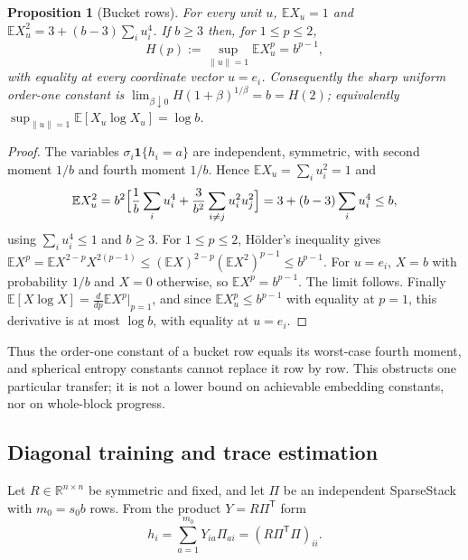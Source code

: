 \documentclass[11pt,a4paper]{article}
\newtheorem{proposition}[theorem]{Proposition}
\theoremstyle{definition}
\theoremstyle{remark}
\newcommand{\E}{\mathbb E}
\newcommand{\R}{\mathbb R}
\newcommand{\norm}[1]{\lVert#1\rVert}
\newcommand{\1}{\mathbf 1}
\newcommand{\T}{\mathsf T}
\begin{document}
\begin{proposition}[Bucket rows]\label{prop:bucketrow}
For every unit $u$, $\E X_u=1$ and $\E X_u^2=3+(b-3)\sum_iu_i^4$. If
$b\ge3$ then, for $1\le p\le2$,
\[
 H(p):=\sup_{\norm u=1}\E X_u^p=b^{p-1},
\]
with equality at every coordinate vector $u=e_i$. Consequently the sharp
uniform order-one constant is
$\lim_{\beta\downarrow0}H(1+\beta)^{1/\beta}=b=H(2)$; equivalently
$\sup_{\norm u=1}\E[X_u\log X_u]=\log b$.
\end{proposition}
\begin{proof}
The variables $\sigma_i\1\{h_i=a\}$ are independent, symmetric, with
second moment $1/b$ and fourth moment $1/b$. Hence $\E X_u=\sum_iu_i^2=1$
and
\[
 \E X_u^2=b^2\Bigl[\frac1b\sum_iu_i^4+\frac3{b^2}\sum_{i\ne j}u_i^2u_j^2\Bigr]
 =3+(b-3)\sum_iu_i^4\le b,
\]
using $\sum_iu_i^4\le1$ and $b\ge3$. For $1\le p\le2$, H\"older's
inequality gives
$\E X^p=\E X^{2-p}X^{2(p-1)}\le(\E X)^{2-p}(\E X^2)^{p-1}\le b^{p-1}$.
For $u=e_i$, $X=b$ with probability $1/b$ and $X=0$ otherwise, so
$\E X^p=b^{p-1}$. The limit follows. Finally
$\E[X\log X]=\frac{d}{dp}\E X^p|_{p=1}$, and since $\E X_u^p\le b^{p-1}$
with equality at $p=1$, this derivative is at most $\log b$, with
equality at $u=e_i$.
\end{proof}

Thus the order-one constant of a bucket row equals its worst-case fourth
moment, and spherical entropy constants cannot replace it row by row.
This obstructs one particular transfer; it is not a lower bound on
achievable embedding constants, nor on whole-block progress.

\subsection{Diagonal training and trace estimation}\label{sec:diagtrain}
Let $R\in\R^{n\times n}$ be symmetric and fixed, and let $\Pi$ be an
independent SparseStack with $m_0=s_0b$ rows. From the product
$Y=R\Pi^\T$ form
\[
 h_i=\sum_{a=1}^{m_0}Y_{ia}\Pi_{ai}=(R\Pi^\T\Pi)_{ii}.
\]
\end{document}
